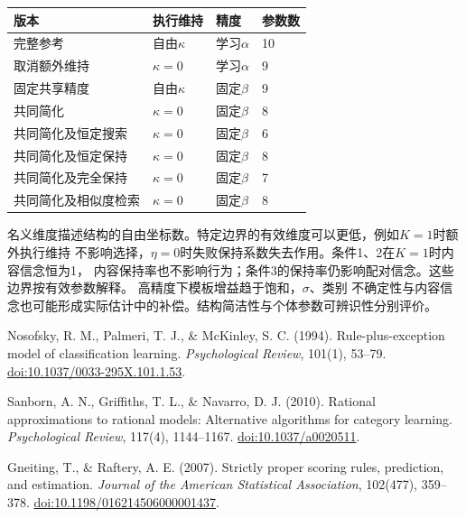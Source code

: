 \documentclass[11pt,a4paper]{article}
\numberwithin{equation}{section}
\begin{document}
\begin{center}
\begin{tabularx}{\textwidth}{Y p{2.2cm} p{2.3cm} L{1.6cm}}
\toprule
版本 & 执行维持 & 精度 & 参数数\\
\midrule
完整参考 & 自由$\kappa$ & 学习$\alpha$ & 10\\
取消额外维持 & $\kappa=0$ & 学习$\alpha$ & 9\\
固定共享精度 & 自由$\kappa$ & 固定$\beta$ & 9\\
共同简化 & $\kappa=0$ & 固定$\beta$ & 8\\
共同简化及恒定搜索 & $\kappa=0$ & 固定$\beta$ & 6\\
共同简化及恒定保持 & $\kappa=0$ & 固定$\beta$ & 8\\
共同简化及完全保持 & $\kappa=0$ & 固定$\beta$ & 7\\
共同简化及相似度检索 & $\kappa=0$ & 固定$\beta$ & 8\\
\bottomrule
\end{tabularx}
\end{center}
名义维度描述结构的自由坐标数。特定边界的有效维度可以更低，例如$K=1$时额外执行维持
不影响选择，$\eta=0$时失败保持系数失去作用。条件1、2在$K=1$时内容信念恒为1，
内容保持率也不影响行为；条件3的保持率仍影响配对信念。这些边界按有效参数解释。
高精度下模板增益趋于饱和，$\sigma$、类别
不确定性与内容信念也可能形成实际估计中的补偿。结构简洁性与个体参数可辨识性分别评价。

\begin{thebibliography}{9}
Nosofsky, R. M., Palmeri, T. J., \& McKinley, S. C. (1994).
Rule-plus-exception model of classification learning.
\textit{Psychological Review}, 101(1), 53--79.
\href{https://doi.org/10.1037/0033-295X.101.1.53}{doi:10.1037/0033-295X.101.1.53}.

Sanborn, A. N., Griffiths, T. L., \& Navarro, D. J. (2010).
Rational approximations to rational models: Alternative algorithms for category learning.
\textit{Psychological Review}, 117(4), 1144--1167.
\href{https://doi.org/10.1037/a0020511}{doi:10.1037/a0020511}.

Gneiting, T., \& Raftery, A. E. (2007).
Strictly proper scoring rules, prediction, and estimation.
\textit{Journal of the American Statistical Association}, 102(477), 359--378.
\href{https://doi.org/10.1198/016214506000001437}{doi:10.1198/016214506000001437}.
\end{thebibliography}
\end{document}
